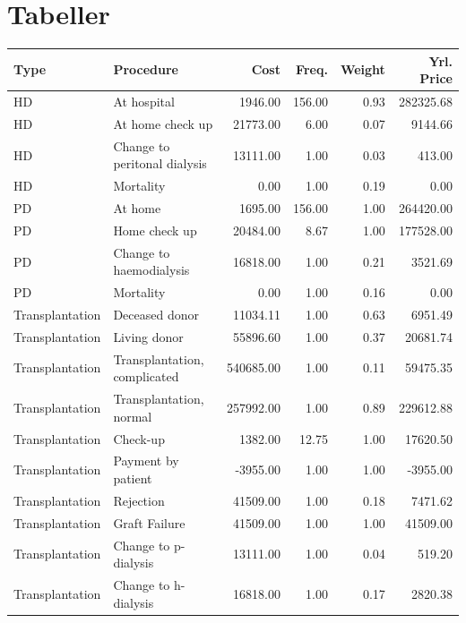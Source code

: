 \documentclass[a4paper,12pt]{article}
\begin{document}
\section{Tabeller}



\begin{adjustbox}{center}

	\centering
	\begin{tabular}{llrrrr}
		\hline
		Type & Procedure & Cost & Freq. & Weight & Yrl. Price \\ 
		\hline
		HD & At hospital & 1946.00 & 156.00 & 0.93 & 282325.68 \\ 
		HD & At home check up & 21773.00 & 6.00 & 0.07 & 9144.66 \\ 
		HD & Change to peritonal dialysis & 13111.00 & 1.00 & 0.03 & 413.00 \\ 
		HD & Mortality & 0.00 & 1.00 & 0.19 & 0.00 \\ 
		PD & At home  & 1695.00 & 156.00 & 1.00 & 264420.00 \\ 
		PD & Home check up & 20484.00 & 8.67 & 1.00 & 177528.00 \\ 
		PD & Change to haemodialysis & 16818.00 & 1.00 & 0.21 & 3521.69 \\ 
		PD & Mortality & 0.00 & 1.00 & 0.16 & 0.00 \\ 
		Transplantation & Deceased donor & 11034.11 & 1.00 & 0.63 & 6951.49 \\ 
		Transplantation & Living donor & 55896.60 & 1.00 & 0.37 & 20681.74 \\ 
		Transplantation & Transplantation, complicated & 540685.00 & 1.00 & 0.11 & 59475.35 \\ 
		Transplantation & Transplantation, normal & 257992.00 & 1.00 & 0.89 & 229612.88 \\ 
		Transplantation & Check-up & 1382.00 & 12.75 & 1.00 & 17620.50 \\ 
		Transplantation & Payment by patient  & -3955.00 & 1.00 & 1.00 & -3955.00 \\ 
		Transplantation & Rejection & 41509.00 & 1.00 & 0.18 & 7471.62 \\ 
		Transplantation & Graft Failure & 41509.00 & 1.00 & 1.00 & 41509.00 \\ 
		Transplantation & Change to p-dialysis & 13111.00 & 1.00 & 0.04 & 519.20 \\ 
		Transplantation & Change to h-dialysis & 16818.00 & 1.00 & 0.17 & 2820.38 \\ 

\end{tabular}
\end{adjustbox}
\end{document}
